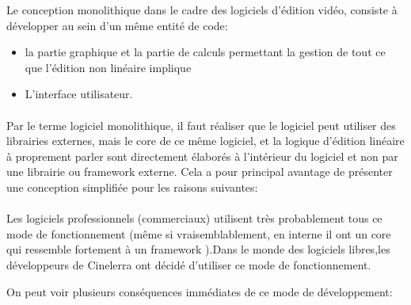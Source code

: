 Le conception monolithique  dans le cadre des
logiciels d'édition vidéo, consiste à développer au sein d'un même
entité de code:

\begin{itemize} \setlength{\itemsep}{2mm}

  \item {la partie graphique et la partie de calculs
    permettant la gestion de tout ce que l'édition non linéaire
    implique}

  \item {L'interface utilisateur.}

\end {itemize}

\paragraph{}

Par le terme logiciel monolithique, il faut réaliser
que le logiciel peut utiliser des librairies externes, mais le core
de ce même logiciel, et la logique d'édition linéaire à proprement
parler sont directement élaborés à l'intérieur du logiciel et non
par une librairie ou framework  externe. Cela a pour
principal avantage de présenter une conception simplifiée pour les
raisons suivantes:

\paragraph{}

Les logiciels professionnels (commerciaux) utilisent très probablement
tous ce mode de fonctionnement (même si vraisemblablement,
en interne il ont un core qui ressemble fortement à un framework
).Dans le monde des logiciels libres,les développeurs
de Cinelerra ont décidé d'utiliser ce mode de fonctionnement.

On peut voir plusieurs conséquences immédiates de ce mode de
développement:

